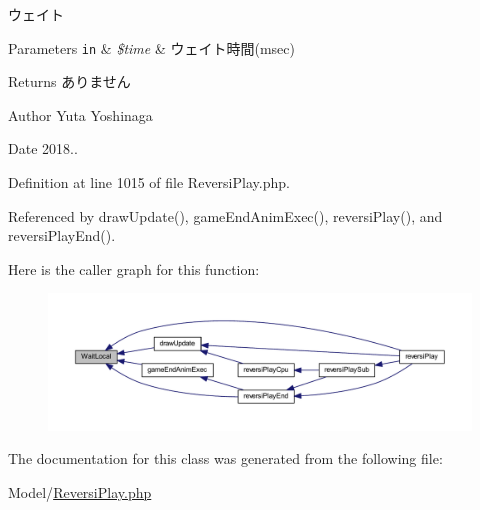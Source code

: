 ウェイト 


\begin{DoxyParams}[1]{Parameters}
\mbox{\tt in}  & {\em \$time} & ウェイト時間(msec) \\
\hline
\end{DoxyParams}
\begin{DoxyReturn}{Returns}
ありません 
\end{DoxyReturn}
\begin{DoxyAuthor}{Author}
Yuta Yoshinaga 
\end{DoxyAuthor}
\begin{DoxyDate}{Date}
2018.. 
\end{DoxyDate}


Definition at line 1015 of file Reversi\+Play.\+php.



Referenced by draw\+Update(), game\+End\+Anim\+Exec(), reversi\+Play(), and reversi\+Play\+End().

Here is the caller graph for this function\+:
\nopagebreak
\begin{figure}[H]
\begin{center}
\leavevmode
\includegraphics[width=350pt]{class_reversi_play_a58884d8de55d9faeac653fcf6d4f48b3_icgraph}
\end{center}
\end{figure}


The documentation for this class was generated from the following file\+:\begin{DoxyCompactItemize}
\item 
Model/\hyperlink{_reversi_play_8php}{Reversi\+Play.\+php}\end{DoxyCompactItemize}
